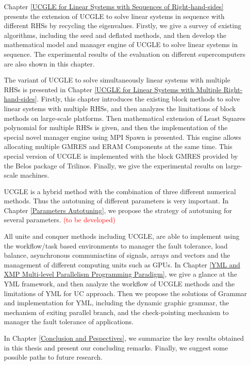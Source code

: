 Chapter \ref{UCGLE for Linear Systems with Sequences of Right-hand-sides} presents the extension of UCGLE to solve linear systems in sequence with different RHSs by recycling the eigenvalues. Firstly, we give a survey of existing algorithms, including the seed and deflated methods, and then develop the mathematical model and manager engine of UCGLE to solve linear systems in sequence. The experimental results of the evaluation on different supercomputers are also shown in this chapter.

The variant of UCGLE to solve simultaneously linear systems with multiple RHSs is presented in Chapter \ref{UCGLE for Linear Systems with Multiple Right-hand-sides}. Firstly, this chapter introduces the existing block methods to solve linear systems with multiple RHSs, and then analyzes the limitations of block methods on large-scale platforms. Then mathematical extension of Least Squares polynomial for multiple RHSs is given, and then the implementation of the special novel manager engine using MPI Spawn is presented. This engine allows allocating multiple GMRES and ERAM Components at the same time. This special version of UCGLE is implemented with the block GMRES provided by the Belos package of Trilinos. Finally, we give the experimental results on large-scale machines.

UCGLE is a hybrid method with the combination of three different numerical methods. Thus the autotuning of different parameters is very important. In Chapter \ref{Parameters Autotuning}, we propose the strategy of autotuning for several parameters. \textcolor{red}{(to be developed)}

All unite and conquer methods including UCGLE, are able to implement using the workflow/task based environments to manager the fault tolerance, load balance, asynchronous communiactins of signals, arrays and vectors and the management of different computing units such as GPUs. In Chapter \ref{YML and XMP Multi-level Parallelism Programming Paradigm}, we give a glance at the YML framework, and then analyze the workflow of UCGLE methods and the limitations of YML for UC approach. Then we propose the solutions of Grammar and implementation for YML, including the dynamic graphic grammar, the mechanism of exiting parallel branch, and the check-pointing mechanism to manager the fault tolerance of applications.

In Chapter \ref{Conclusion and Pespectives}, we summarize the key results obtained in this thesis and present our concluding remarks. Finally, we suggest some possible paths to future research.
